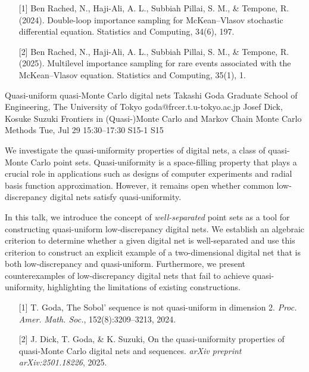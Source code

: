 \begin{talk}
\begin{enumerate}
	\item[{[1]}] Ben Rached, N., Haji-Ali, A. L., Subbiah Pillai, S. M., \& Tempone, R. (2024). Double-loop importance sampling for McKean–Vlasov stochastic differential equation. Statistics and Computing, 34(6), 197.
	\item[{[2]}] Ben Rached, N., Haji-Ali, A. L., Subbiah Pillai, S. M., \& Tempone, R. (2025). Multilevel importance sampling for rare events associated with the McKean–Vlasov equation. Statistics and Computing, 35(1), 1.
\end{enumerate}

\end{talk}

\begin{talk}
  {Quasi-uniform quasi-Monte Carlo digital nets}%
  {Takashi Goda}%
  {Graduate School of Engineering, The University of Tokyo}%
  {goda@frcer.t.u-tokyo.ac.jp}%
  {Josef Dick, Kosuke Suzuki}%
  {Frontiers in (Quasi-)Monte Carlo and Markov Chain Monte Carlo Methods}%
  {Tue, Jul 29 15:30–17:30}%
  {S15-1}%
  {S15}%
				
			
We investigate the quasi-uniformity properties of digital nets, a class of quasi-Monte Carlo point sets. Quasi-uniformity is a space-filling property that plays a crucial role in applications such as designs of computer experiments and radial basis function approximation. However, it remains open whether common low-discrepancy digital nets satisfy quasi-uniformity.

In this talk, we introduce the concept of \emph{well-separated} point sets as a tool for constructing quasi-uniform low-discrepancy digital nets. We establish an algebraic criterion to determine whether a given digital net is well-separated and use this criterion to construct an explicit example of a two-dimensional digital net that is both low-discrepancy and quasi-uniform. Furthermore, we present counterexamples of low-discrepancy digital nets that fail to achieve quasi-uniformity, highlighting the limitations of existing constructions.

\begin{enumerate}
	\item[{[1]}] T. Goda, The Sobol’ sequence is not quasi-uniform in dimension 2. \emph{Proc. Amer. Math. Soc.}, 152(8):3209–3213, 2024.
	\item[{[2]}] J. Dick, T. Goda, \& K. Suzuki, On the quasi-uniformity properties of quasi-Monte Carlo digital nets and sequences. \emph{arXiv preprint arXiv:2501.18226}, 2025.
\end{enumerate}
\end{talk}

